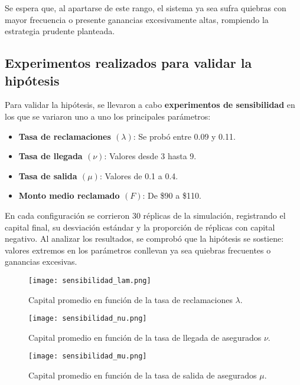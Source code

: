 \documentclass[12pt]{article}
\begin{document}
Se espera que, al apartarse de este rango, el sistema ya sea sufra quiebras con mayor frecuencia o presente ganancias excesivamente altas, rompiendo la estrategia prudente planteada.

\subsection{Experimentos realizados para validar la hipótesis}

Para validar la hipótesis, se llevaron a cabo \textbf{experimentos de sensibilidad} en los que se variaron uno a uno los principales parámetros:

\begin{itemize}
    \item \textbf{Tasa de reclamaciones $(\lambda)$}: Se probó entre 0.09 y 0.11.
    \item \textbf{Tasa de llegada $(\nu)$}: Valores desde 3 hasta 9.
    \item \textbf{Tasa de salida $(\mu)$}: Valores de 0.1 a 0.4.
    \item \textbf{Monto medio reclamado $(F)$}: De \$90 a \$110.
\end{itemize}

En cada configuración se corrieron 30 réplicas de la simulación, registrando el capital final, su desviación estándar y la proporción de réplicas con capital negativo. Al analizar los resultados, se comprobó que la hipótesis se sostiene: valores extremos en los parámetros conllevan ya sea quiebras frecuentes o ganancias excesivas.

\begin{figure}[h!]
    \centering
    \texttt{[image: sensibilidad\_lam.png]}
    \caption{Capital promedio en función de la tasa de reclamaciones $\lambda$.}
    \label{fig:sensibilidad_lam}
\end{figure}

\begin{figure}[h!]
    \centering
    \texttt{[image: sensibilidad\_nu.png]}
    \caption{Capital promedio en función de la tasa de llegada de asegurados $\nu$.}
    \label{fig:sensibilidad_nu}
\end{figure}

\begin{figure}[h!]
    \centering
    \texttt{[image: sensibilidad\_mu.png]}
    \caption{Capital promedio en función de la tasa de salida de asegurados $\mu$.}
    \label{fig:sensibilidad_mu}
\end{figure}
\end{document}
